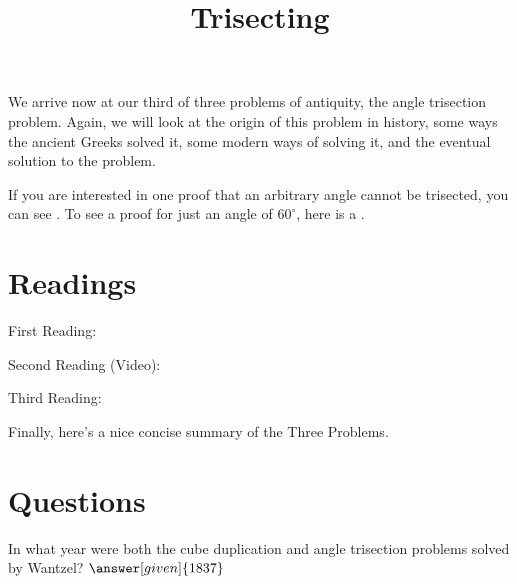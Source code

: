 \documentclass{ximera}
\title{Trisecting}
\begin{document}
\begin{abstract}
\end{abstract}
\maketitle

We arrive now at our third of three problems of antiquity, the angle trisection 
problem.  Again, we will look at the origin of this problem in history, some ways 
the ancient Greeks solved it, some modern ways of solving it, and the eventual 
solution to the problem.

If you are interested in one proof that an arbitrary angle cannot be trisected, 
you can see .  
To see a proof for just an angle of $60^{\circ}$, here is a .


\section{Readings}

First Reading: 

Second Reading (Video): 

Third Reading: 

Finally, here's a nice concise summary of the Three Problems. 



\section{Questions}

\begin{question}
In what year were both the cube duplication and angle trisection problems solved by Wantzel? $\answer[given]{1837}$
\end{question}
\end{document}
